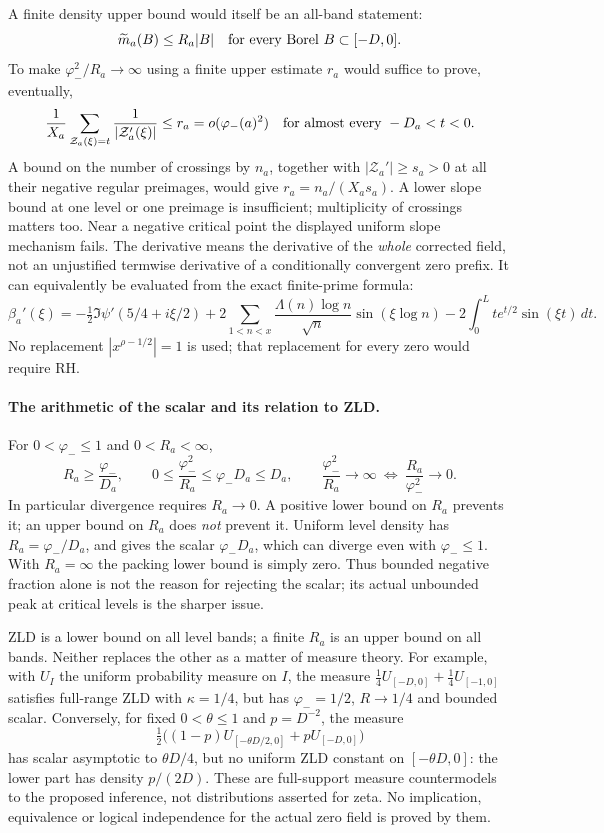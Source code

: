 A finite density upper bound would itself be an all-band statement:
\[
 \widetilde m_a(B)\le R_a|B|\quad\hbox{for every Borel }B\subset[-D,0].
\]
To make $\varphi_-^2/R_a\to\infty$ using a finite upper estimate $r_a$
would suffice to prove, eventually,
\begin{equation}\label{eq:v149-slope-demand}
 \frac1{X_a}\sum_{\mathcal Z_a(\xi)=t}\frac1{|\mathcal Z_a'(\xi)|}
 \le r_a=o(\varphi_-(a)^2)
 \quad\hbox{for almost every }-D_a<t<0.
\end{equation}
A bound on the number of crossings by $n_a$, together with
$|\mathcal Z_a'|\ge s_a>0$ at all their negative regular preimages,
would give $r_a=n_a/(X_as_a)$. A lower slope bound at one level or
one preimage is insufficient; multiplicity of crossings matters too.
Near a negative critical point the displayed uniform slope mechanism
fails. The derivative means the derivative of the \emph{whole} corrected
field, not an unjustified termwise derivative of a conditionally
convergent zero prefix. It can equivalently be evaluated from the exact
finite-prime formula:
\[
 \beta_a'(\xi)=-\tfrac12\Im\psi'(5/4+i\xi/2)
   +2\sum_{1<n<x}\frac{\Lambda(n)\log n}{\sqrt n}\sin(\xi\log n)
   -2\int_0^L t e^{t/2}\sin(\xi t)\,dt.
\]
No replacement $|x^{\rho-1/2}|=1$ is used; that replacement for every
zero would require RH.

\paragraph{The arithmetic of the scalar and its relation to ZLD.}
For $0<\varphi_-\le1$ and $0<R_a<\infty$,
\begin{equation}\label{eq:v149-scalar-arithmetic}
 R_a\ge\frac{\varphi_-}{D_a},\qquad
 0\le\frac{\varphi_-^2}{R_a}\le\varphi_-D_a\le D_a,
 \qquad
 \frac{\varphi_-^2}{R_a}\to\infty
 \ \Longleftrightarrow\ \frac{R_a}{\varphi_-^2}\to0.
\end{equation}
In particular divergence requires $R_a\to0$. A positive lower bound
on $R_a$ prevents it; an upper bound on $R_a$ does \emph{not} prevent
it. Uniform level density has $R_a=\varphi_-/D_a$, and gives the
scalar $\varphi_-D_a$, which can diverge even with $\varphi_-\le1$.
With $R_a=\infty$ the packing lower bound is simply zero. Thus bounded
negative fraction alone is not the reason for rejecting the scalar;
its actual unbounded peak at critical levels is the sharper issue.

ZLD is a lower bound on all level bands; a finite $R_a$ is an upper
bound on all bands. Neither replaces the other as a matter of measure
theory. For example, with $U_I$ the uniform probability measure on
$I$, the measure
$\tfrac14U_{[-D,0]}+\tfrac14U_{[-1,0]}$ satisfies full-range ZLD with
$\kappa=1/4$, but has $\varphi_-=1/2$, $R\to1/4$ and bounded scalar.
Conversely, for fixed $0<\theta\le1$ and $p=D^{-2}$, the measure
\[
 \tfrac12\bigl((1-p)U_{[-\theta D/2,0]}+pU_{[-D,0]}\bigr)
\]
has scalar asymptotic to $\theta D/4$, but no uniform ZLD constant
on $[-\theta D,0]$: the lower part has density $p/(2D)$.
These are full-support measure countermodels to the proposed inference,
not distributions asserted for zeta. No implication, equivalence or
logical independence for the actual zero field is proved by them.

